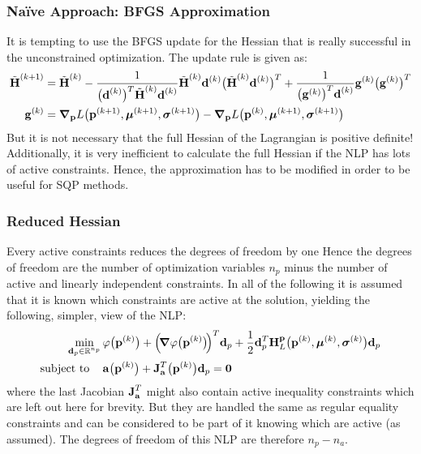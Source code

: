 			\subsubsection{Na{\"i}ve Approach: BFGS Approximation}
				It is tempting to use the BFGS update for the Hessian that is really successful in the unconstrained optimization. The update rule is given as:
				\begin{align*}
					\tilde{\boldsymbol{\mathrm{H}}}^{(k + 1)} &= \tilde{\boldsymbol{\mathrm{H}}}^{(k)}
						- \frac{1}{\big(\boldsymbol{\mathrm{d}}^{(k)}\big)^T \tilde{\boldsymbol{\mathrm{H}}}^{(k)} \boldsymbol{\mathrm{d}}^{(k)}} \tilde{\boldsymbol{\mathrm{H}}}^{(k)} \boldsymbol{\mathrm{d}}^{(k)} \big(\tilde{\boldsymbol{\mathrm{H}}}^{(k)} \boldsymbol{\mathrm{d}}^{(k)}\big)^T
						+ \frac{1}{\big(\boldsymbol{\mathrm{g}}^{(k)}\big)^T \boldsymbol{\mathrm{d}}^{(k)}} \boldsymbol{\mathrm{g}}^{(k)} \big(\boldsymbol{\mathrm{g}}^{(k)}\big)^T \\
					\boldsymbol{\mathrm{g}}^{(k)} &= \grad_{\boldsymbol{\mathrm{p}}}L\big(\boldsymbol{\mathrm{p}}^{(k + 1)}, \boldsymbol{\mathrm{\mu}}^{(k + 1)}, \boldsymbol{\mathrm{\sigma}}^{(k + 1)}\big) - \grad_{\boldsymbol{\mathrm{p}}}L\big(\boldsymbol{\mathrm{p}}^{(k)}, \boldsymbol{\mathrm{\mu}}^{(k + 1)}, \boldsymbol{\mathrm{\sigma}}^{(k + 1)}\big)
				\end{align*}
				But it is not necessary that the full Hessian of the Lagrangian is positive definite! Additionally, it is very inefficient to calculate the full Hessian if the NLP has lots of active constraints. Hence, the approximation has to be modified in order to be useful for SQP methods.

			\subsubsection{Reduced Hessian} %
				Every active constraints reduces the degrees of freedom by one Hence the degrees of freedom are the number of optimization variables \(n_p\) minus the number of active and linearly independent constraints. In all of the following it is assumed that it is known which constraints are active at the solution, yielding the following, simpler, view of the NLP:
				\begin{align}
					\min_{\boldsymbol{\mathrm{d}}_p \in \mathbb{R}^{n_p}} &\, \varphi\big(\boldsymbol{\mathrm{p}}^{(k)}\big) + \Big(\!\grad{\varphi}\big(\boldsymbol{\mathrm{p}}^{(k)}\big)\!\Big)^T \boldsymbol{\mathrm{d}}_p + \frac{1}{2} \boldsymbol{\mathrm{d}}_p^T \boldsymbol{\mathrm{H}}_L^{\boldsymbol{\mathrm{p}}}\big(\boldsymbol{\mathrm{p}}^{(k)}, \boldsymbol{\mathrm{\mu}}^{(k)}, \boldsymbol{\mathrm{\sigma}}^{(k)}\big) \boldsymbol{\mathrm{d}}_p \\
					\mathrm{subject~to}\quad &\,
						\begin{alignedat}[t]{2}
							\boldsymbol{\mathrm{a}}\big(\boldsymbol{\mathrm{p}}^{(k)}\big) + \boldsymbol{\mathrm{J}}_{\boldsymbol{\mathrm{a}}}^T\big(\boldsymbol{\mathrm{p}}^{(k)}\big) \boldsymbol{\mathrm{d}}_p &= \boldsymbol{\mathrm{0}}
						\end{alignedat}  \label{eq:activeQp}
				\end{align}
				where the last Jacobian \( \boldsymbol{\mathrm{J}}_{\boldsymbol{\mathrm{a}}}^T \) might also contain active inequality constraints which are left out here for brevity. But they are handled the same as regular equality constraints and can be considered to be part of it knowing which are active (as assumed). The degrees of freedom of this NLP are therefore \( n_p - n_a \).
				
